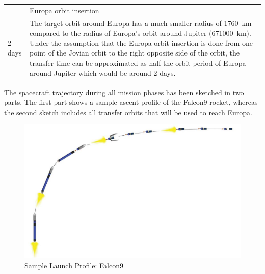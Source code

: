 \begin{longtable}{lp{}}
  & Europa orbit insertion \\

  2 days

  & The target orbit around Europa has a much smaller radius of
  \SI{1760}{km} compared to the radius of Europa's orbit around
  Jupiter (\SI{671000}{km}).  Under the assumption that the Europa
  orbit insertion is done from one point of the Jovian orbit to the
  right opposite side of the orbit, the transfer time can be
  approximated as half the orbit period of Europa around Jupiter which
  would be around 2 days. \\ \bottomrule
\end{longtable}



The spacecraft trajectory during all mission phases has been sketched
in two parts. The first part shows a sample ascent profile of the
Falcon9 rocket, whereas the second sketch includes all transfer orbits
that will be used to reach Europa.

\begin{figure}[H]
  \includegraphics[width=\textwidth]{Launch-Profile}
  \caption{Sample Launch Profile: Falcon9 \cite{LVCFalcon9}}
\end{figure}

